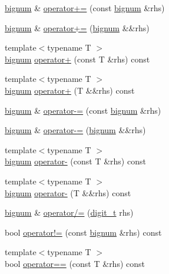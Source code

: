 \begin{DoxyCompactItemize}
\item 
\hyperlink{classyuh_1_1bignum}{bignum} \& \hyperlink{classyuh_1_1bignum_ae133fb5a0dbf20c5a367428a7298cd45}{operator+=} (const \hyperlink{classyuh_1_1bignum}{bignum} \&rhs)
\item 
\hyperlink{classyuh_1_1bignum}{bignum} \& \hyperlink{classyuh_1_1bignum_a557d6469a8fa7fe2a9c43f47c2e0a397}{operator+=} (\hyperlink{classyuh_1_1bignum}{bignum} \&\&rhs)
\item 
{\footnotesize template$<$typename T $>$ }\\\hyperlink{classyuh_1_1bignum}{bignum} \hyperlink{classyuh_1_1bignum_a660d0dc06426a82c02f4fc6193ae9645}{operator+} (const \-T \&rhs) const 
\item 
{\footnotesize template$<$typename T $>$ }\\\hyperlink{classyuh_1_1bignum}{bignum} \hyperlink{classyuh_1_1bignum_a942f849ccfd705e1286d56407aa33a29}{operator+} (\-T \&\&rhs) const 
\item 
\hyperlink{classyuh_1_1bignum}{bignum} \& \hyperlink{classyuh_1_1bignum_acc6e61a9b35a338baaf46dd69ab31a51}{operator-\/=} (const \hyperlink{classyuh_1_1bignum}{bignum} \&rhs)
\item 
\hyperlink{classyuh_1_1bignum}{bignum} \& \hyperlink{classyuh_1_1bignum_a7700ce4f82ad4b8babfbf222872cd2da}{operator-\/=} (\hyperlink{classyuh_1_1bignum}{bignum} \&\&rhs)
\item 
{\footnotesize template$<$typename T $>$ }\\\hyperlink{classyuh_1_1bignum}{bignum} \hyperlink{classyuh_1_1bignum_a9a1a2bced2e21dd21fb454805269e393}{operator-\/} (const \-T \&rhs) const 
\item 
{\footnotesize template$<$typename T $>$ }\\\hyperlink{classyuh_1_1bignum}{bignum} \hyperlink{classyuh_1_1bignum_a041e21a9b9fac16e91a885c826231015}{operator-\/} (\-T \&\&rhs) const 
\item 
\hyperlink{classyuh_1_1bignum}{bignum} \& \hyperlink{classyuh_1_1bignum_a86173f9b9d3c4f31818dd690d970d74d}{operator/=} (\hyperlink{classyuh_1_1bignum_a918fd2d7b4fcfb6452272f1477745a53}{digit\-\_\-t} rhs)
\item 
bool \hyperlink{classyuh_1_1bignum_a4c1c326141df7d0b500cd9611de09651}{operator!=} (const \hyperlink{classyuh_1_1bignum}{bignum} \&rhs) const 
\item 
{\footnotesize template$<$typename T $>$ }\\bool \hyperlink{classyuh_1_1bignum_a4f6bae68dc463f483799107172061444}{operator==} (const \-T \&rhs) const 

\end{DoxyCompactItemize}

